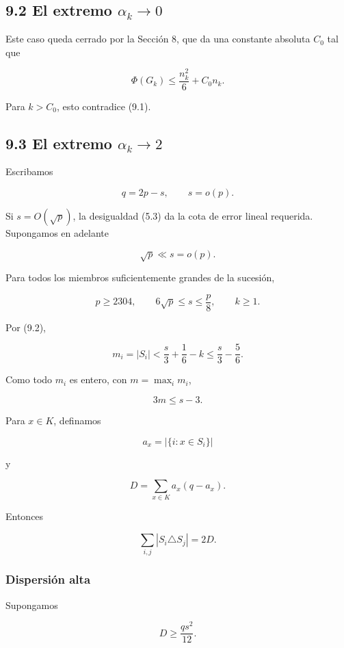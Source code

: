 \documentclass[
  11pt,
]{article}
\begin{document}
\subsection{\texorpdfstring{9.2 El extremo
\(\alpha_k\to0\)}{9.2 El extremo \textbackslash alpha\_k\textbackslash to0}}\label{el-extremo-alpha_kto0}

Este caso queda cerrado por la Sección 8, que da una constante absoluta
\(C_0\) tal que

\[
\Phi(G_k)
\le
\frac{n_k^2}{6}+C_0n_k.
\]

Para \(k>C_0\), esto contradice (9.1).

\subsection{\texorpdfstring{9.3 El extremo
\(\alpha_k\to2\)}{9.3 El extremo \textbackslash alpha\_k\textbackslash to2}}\label{el-extremo-alpha_kto2}

Escribamos

\[
q=2p-s,
\qquad
s=o(p).
\]

Si \(s=O(\sqrt p)\), la desigualdad (5.3) da la cota de error lineal
requerida. Supongamos en adelante

\[
\sqrt p\ll s=o(p).
\tag{9.3}
\]

Para todos los miembros suficientemente grandes de la sucesión,

\[
p\ge2304,
\qquad
6\sqrt p\le s\le\frac p8,
\qquad
k\ge1.
\tag{9.4}
\]

Por (9.2),

\[
m_i=|S_i|
<
\frac s3+\frac16-k
\le
\frac s3-\frac56.
\]

Como todo \(m_i\) es entero, con \(m=\max_i m_i\),

\[
\boxed{3m\le s-3.}
\tag{9.5}
\]

Para \(x\in K\), definamos

\[
a_x=|\{i:x\in S_i\}|
\]

y

\[
D=\sum_{x\in K}a_x(q-a_x).
\tag{9.6}
\]

Entonces

\[
\sum_{i,j}|S_i\triangle S_j|=2D.
\tag{9.7}
\]

\subsubsection{Dispersión alta}\label{dispersiuxf3n-alta}

Supongamos

\[
D\ge\frac{qs^2}{12}.
\tag{9.8}
\]
\end{document}
